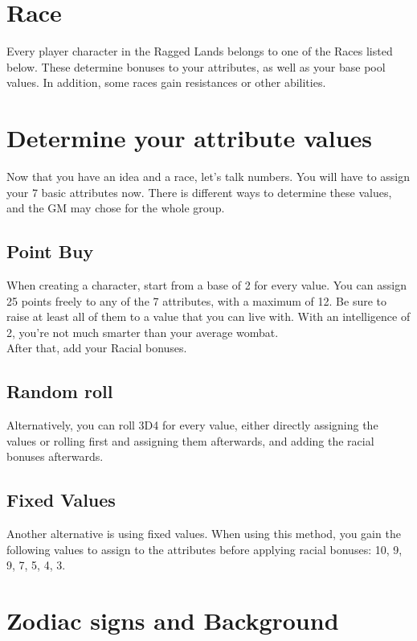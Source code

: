\section{Race}

Every player character in the Ragged Lands belongs to one of the Races listed below. These determine bonuses to your attributes, as well as your base pool values. In addition, some races gain resistances or other abilities.


\section{Determine your attribute values}

Now that you have an idea and a race, let’s talk numbers. You will have to assign your 7 basic attributes now. There is different ways to determine these values, and the GM may chose for the whole group.


\subsection{Point Buy}

When creating a character, start from a base of 2 for every value. You can assign 25 points freely to any of the 7 attributes, with a maximum of 12. Be sure to raise at least all of them to a value that you can live with. With an intelligence of 2, you’re not much smarter than your average wombat.\\
After that, add your Racial bonuses.


\subsection{Random roll}

Alternatively, you can roll 3D4 for every value, either directly assigning the values or rolling first and assigning them afterwards, and adding the racial bonuses afterwards. 


\subsection{Fixed Values}

Another alternative is using fixed values. When using this method, you gain the following values to assign to the attributes before applying racial bonuses: 10, 9, 9, 7, 5, 4, 3.


\section{Zodiac signs and Background}

